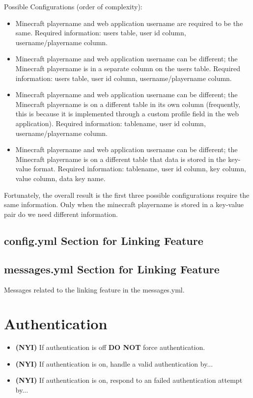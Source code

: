 \documentclass[letterpaper,12pt]{article}
\begin{document}
  Possible Configurations (order of complexity):
  \begin{itemize}
    \item Minecraft playername and web application username are required to be
      the same. Required information: users table, user id column,
      username/playername column.
    \item Minecraft playername and web application username can be different;
      the Minecraft playername is in a separate column on the users table.
      Required information: users table, user id column, username/playername
      column.
    \item Minecraft playername and web application username can be different;
      the Minecraft playername is on a different table in its own column
      (frequently, this is because it is implemented through a custom profile
      field in the web application). Required information: tablename, user id
      column, username/playername column.
    \item Minecraft playername and web application username can be different;
      the Minecraft playername is on a different table that data is stored in
      the key-value format. Required information: tablename, user id column,
      key column, value column, data key name.
  \end{itemize}

  Fortunately, the overall result is the first three possible configurations
  require the same information. Only when the minecraft playername is stored in
  a key-value pair do we need different information.
  
  \clearpage
  
  \subsection{config.yml Section for Linking Feature}
  
  
  \subsection{messages.yml Section for Linking Feature}
  Messages related to the linking feature in the messages.yml.
  

  \clearpage
  \section{Authentication}
  \begin{itemize}
    \item {\bf (NYI)} If authentication is off {\bf DO NOT} force authentication.
    \item {\bf (NYI)} If authentication is on, handle a valid authentication by...
    \item {\bf (NYI)} If authentication is on, respond to an failed authentication attempt by...
  \end{itemize}
\end{document}
